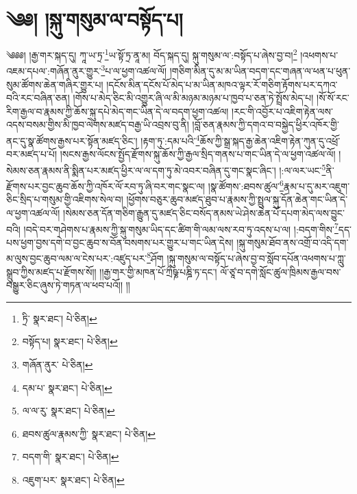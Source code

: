 \setcounter{footnote}{0} 
\chapter{༄༅། །སྐུ་གསུམ་ལ་བསྟོད་པ།}༄༅༅། །རྒྱ་གར་སྐད་དུ། ཀཱ་ཡ་ཏྲ་\footnote{ཏྲི་  སྣར་ཐང་།  པེ་ཅིན། }ཡ་སྟོ་ཏྲ་ནཱ་མ། བོད་སྐད་དུ། སྐུ་གསུམ་ལ་:བསྟོད་པ་ཞེས་བྱ་བ།\footnote{བསྟོད་པ།  སྣར་ཐང་།  པེ་ཅིན། } །འཕགས་པ་འཇམ་དཔལ་:གཞོན་ནུར་གྱུར་\footnote{གཞོན་ནུར་  པེ་ཅིན། }པ་ལ་ཕྱག་འཚལ་ལོ། །གཅིག་མིན་དུ་མ་མ་ཡིན་བདག་དང་གཞན་ལ་ཕན་པ་ཕུན་སུམ་ཚོགས་ཆེན་གཞིར་གྱུར་པ། །དངོས་མིན་དངོས་པོ་མེད་པ་མ་ཡིན་མཁའ་ལྟར་རོ་གཅིག་རྟོགས་པར་དཀའ་བའི་རང་བཞིན་ཅན། །གོས་པ་མེད་ཅིང་མི་འགྱུར་ཞི་ལ་མི་མཉམ་མཉམ་པ་ཁྱབ་པ་ཅན་ཏེ་སྤྲོས་མེད་པ། །སོ་སོ་རང་རིག་རྒྱལ་བ་རྣམས་ཀྱི་ཆོས་སྐུ་དཔེ་མེད་གང་ཡིན་དེ་ལ་བདག་ཕྱག་འཚལ། །རང་གི་འབྱོར་པ་འཇིག་རྟེན་ལས་འདས་བསམ་གྱིས་མི་ཁྱབ་ལེགས་མཛད་བརྒྱ་ཡི་འབྲས་བུ་ནི། །བློ་ཅན་རྣམས་ཀྱི་དགའ་བ་བསྐྱེད་ཕྱིར་འཁོར་གྱི་ནང་དུ་སྣ་ཚོགས་རྒྱས་པར་སྟོན་མཛད་ཅིང་། །རྟག་ཏུ་:དམ་པའི་\footnote{དམ་པ་  སྣར་ཐང་།  པེ་ཅིན། }ཆོས་ཀྱི་སྒྲ་སྐད་རྒྱ་ཆེན་འཇིག་རྟེན་ཀུན་དུ་འཕྲོ་བར་མཛད་པ་པོ། །སངས་རྒྱས་ལོངས་སྤྱོད་རྫོགས་སྐུ་ཆོས་ཀྱི་རྒྱལ་སྲིད་གནས་པ་གང་ཡིན་དེ་ལ་ཕྱག་འཚལ་ལོ། །སེམས་ཅན་རྣམས་ནི་སྨིན་པར་མཛད་ཕྱིར་ལ་ལ་དག་ཏུ་མེ་འབར་བཞིན་དུ་གང་སྣང་ཞིང་། །:ལ་ལར་ཡང་\footnote{ལ་ལ་རུ་  སྣར་ཐང་།  པེ་ཅིན། }ནི་རྫོགས་པར་བྱང་ཆུབ་ཆོས་ཀྱི་འཁོར་ལོ་རབ་ཏུ་ཞི་བར་གང་སྣང་ལ། །སྣ་ཚོགས་:ཐབས་ཚུལ་\footnote{ཐབས་ཚུལ་རྣམས་ཀྱི་  སྣར་ཐང་།  པེ་ཅིན། }རྣམ་པ་དུ་མར་འཇུག་ཅིང་སྲིད་པ་གསུམ་གྱི་འཇིགས་སེལ་བ། །ཕྱོགས་བཅུར་ཆུབ་མཛད་ཐུབ་པ་རྣམས་ཀྱི་སྤྲུལ་སྐུ་དོན་ཆེན་གང་ཡིན་དེ་ལ་ཕྱག་འཚལ་ལོ། །སེམས་ཅན་དོན་གཅིག་རྒྱུན་དུ་མཛད་ཅིང་བསོད་ནམས་ཡེ་ཤེས་ཆེན་པོ་དཔག་མེད་ལས་བྱུང་བའི། །བདེ་བར་གཤེགས་པ་རྣམས་ཀྱི་སྐུ་གསུམ་ཡིད་དང་ཚིག་གི་ལམ་ལས་རབ་ཏུ་འདས་པ་ལ། །:བདག་གིས་\footnote{བདག་གི་  སྣར་ཐང་།  པེ་ཅིན། }དད་པས་ཕྱག་བྱས་དགེ་བ་བྱང་ཆུབ་ས་བོན་བསགས་པར་གྱུར་པ་གང་ཡིན་དེས། །སྐུ་གསུམ་ཐོབ་ནས་འགྲོ་བ་འདི་དག་མ་ལུས་བྱང་ཆུབ་ལམ་ལ་ངེས་པར་:འཛུད་པར་\footnote{འཇུག་པར་  སྣར་ཐང་།  པེ་ཅིན། }ཤོག །སྐུ་གསུམ་ལ་བསྟོད་པ་ཞེས་བྱ་བ་སློབ་དཔོན་འཕགས་པ་ཀླུ་སྒྲུབ་ཀྱིས་མཛད་པ་རྫོགས་སོ།། །།རྒྱ་གར་གྱི་མཁན་པོ་ཀྲྀཥྞ་པཎྜི་ཏ་དང་། ལོ་ཙཱ་བ་དགེ་སློང་ཚུལ་ཁྲིམས་རྒྱལ་བས་བསྒྱུར་ཅིང་ཞུས་ཏེ་གཏན་ལ་ཕབ་པའོ།། །།